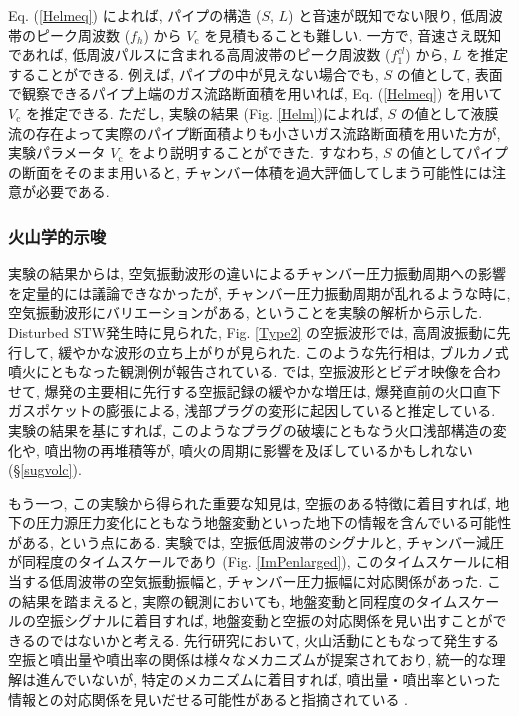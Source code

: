 \documentclass[12pt]{article}
\begin{document}
Eq. (\ref{Helmeq}) によれば, パイプの構造 ($S$, $L$) と音速が既知でない限り, 低周波帯のピーク周波数  ($f_{h}$)  から $V_\mathrm{c}$ を見積もることも難しい. 一方で, 音速さえ既知であれば, 低周波パルスに含まれる高周波帯のピーク周波数 ($f^{cl}_{1}$) から, $L$ を推定することができる. 例えば, パイプの中が見えない場合でも, $S$ の値として, 表面で観察できるパイプ上端のガス流路断面積を用いれば, Eq. (\ref{Helmeq}) を用いて $V_\mathrm{c}$ を推定できる. 
ただし, 実験の結果 (Fig. \ref{Helm})によれば, $S$ の値として液膜流の存在よって実際のパイプ断面積よりも小さいガス流路断面積を用いた方が, 実験パラメータ $V_\mathrm{c}$ をより説明することができた. すなわち, $S$ の値としてパイプの断面をそのまま用いると, チャンバー体積を過大評価してしまう可能性には注意が必要である.


\clearpage
\subsubsection{火山学的示唆}\label{acoshisa}
実験の結果からは, 空気振動波形の違いによるチャンバー圧力振動周期への影響を定量的には議論できなかったが, チャンバー圧力振動周期が乱れるような時に, 空気振動波形にバリエーションがある, ということを実験の解析から示した.
Disturbed STW発生時に見られた, Fig. \ref{Type2} の空振波形では, 高周波振動に先行して, 緩やかな波形の立ち上がりが見られた. このような先行相は, ブルカノ式噴火にともなった観測例が報告されている. \cite{Yokoo2009}では, 空振波形とビデオ映像を合わせて, 爆発の主要相に先行する空振記録の緩やかな増圧は, 爆発直前の火口直下ガスポケットの膨張による, 浅部プラグの変形に起因していると推定している. 実験の結果を基にすれば, このようなプラグの破壊にともなう火口浅部構造の変化や, 噴出物の再堆積等が, 噴火の周期に影響を及ぼしているかもしれない (\S \ref{sugvolc}). 


もう一つ, この実験から得られた重要な知見は, 空振のある特徴に着目すれば, 地下の圧力源圧力変化にともなう地盤変動といった地下の情報を含んでいる可能性がある, という点にある.
実験では, 空振低周波帯のシグナルと, チャンバー減圧が同程度のタイムスケールであり (Fig. \ref{ImPenlarged}), このタイムスケールに相当する低周波帯の空気振動振幅と, チャンバー圧力振幅に対応関係があった. この結果を踏まえると, 実際の観測においても, 地盤変動と同程度のタイムスケールの空振シグナルに着目すれば, 地盤変動と空振の対応関係を見い出すことができるのではないかと考える.
先行研究において, 火山活動にともなって発生する空振と噴出量や噴出率の関係は様々なメカニズムが提案されており, 統一的な理解は進んでいないが, 特定のメカニズムに着目すれば, 噴出量・噴出率といった情報との対応関係を見いだせる可能性があると指摘されている \citep{Ichihara2016a}.
\end{document}
